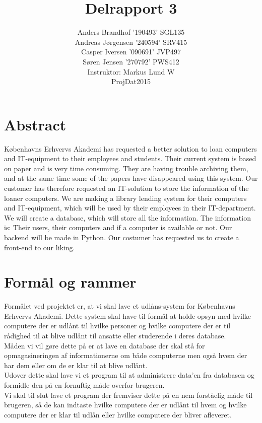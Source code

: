 \documentclass[a4paper]{article}
\title{Delrapport 3}
\author{Anders Brandhof '190493' SGL135 \\ Andreas Jørgensen '240594' SRV415 \\ Casper Iversen '090691' JVP497 \\ Søren Jensen '270792' PWS412 \\
Instruktor: Markus Lund W\\
ProjDat2015}
\begin{document}
\maketitle

\pagebreak

\tableofcontents

\newpage

\section{Abstract}
Københavns Erhvervs Akademi has requested a better solution to loan computers and IT-equipment to their employees and students. Their current system is based on paper and is very time consuming. They are having trouble archiving them, and at the same time some of the papers have disappeared using this system. Our customer has therefore requested an IT-solution to store the information of the loaner computers. We are making a library lending system for their computers and IT-equipment, which will be used by their employees in their IT-department. We will create a database, which will store all the information. The information is: Their users, their computers and if a computer is available or not. Our backend will be made in Python. Our costumer has requested us to create a front-end to our liking.
\pagebreak
\section{Formål og rammer}
Formålet ved projektet er, at vi skal lave et udlåns-system for Københavns Erhvervs Akademi. Dette system skal have til formål at holde opsyn med hvilke computere der er udlånt til hvilke personer og hvilke computere der er til rådighed til at blive udlånt til ansatte eller studerende i deres database.\\
Måden vi vil gøre dette på er at lave en database der skal stå for opmagasineringen af informationerne om både computerne men også hvem der har dem eller om de er klar til at blive udlånt.\\
Udover dette skal lave vi et program til at administrere data’en fra databasen og formidle den på en fornuftig måde overfor brugeren.\\
Vi skal til slut lave et program der fremviser dette på en nem forståelig måde til brugeren, så de kan indtaste hvilke computere der er udlånt til hvem og hvilke computere der er klar til udlån eller hvilke computere der bliver afleveret.\\ \\
\end{document}
